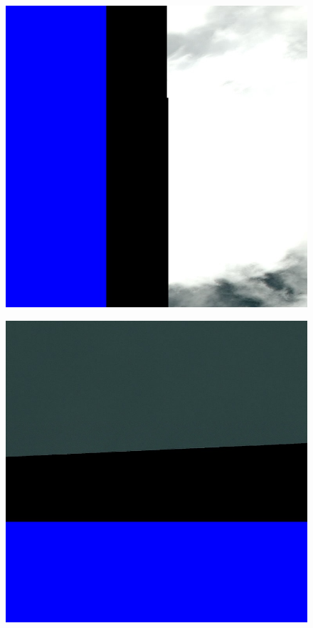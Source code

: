 \begin{figure}
\centering
\includegraphics{preprocessing_pic/2.2.jpg}
\caption{}
\end{figure}

\begin{figure}
\centering
\includegraphics{preprocessing_pic/2.3.jpg}
\caption{}
\end{figure}


